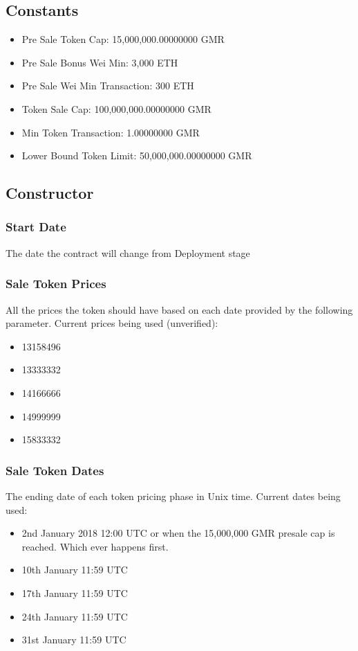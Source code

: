 \documentclass[11pt]{article} %
\begin{document}
\subsection{Constants}

\begin{itemize}
\item Pre Sale Token Cap: 15,000,000.00000000 GMR
\item Pre Sale Bonus Wei Min: 3,000 ETH
\item Pre Sale Wei Min Transaction: 300 ETH
\item Token Sale Cap: 100,000,000.00000000 GMR
\item Min Token Transaction: 1.00000000 GMR
\item Lower Bound Token Limit: 50,000,000.00000000 GMR
\end{itemize}

\subsection{Constructor}

\subsubsection{Start Date}
The date the contract will change from Deployment stage


\subsubsection{Sale Token Prices}
All the prices the token should have based on each date provided by the following parameter.
Current prices being used (unverified): 

\begin{itemize}
\item 13158496
\item 13333332
\item 14166666
\item 14999999
\item 15833332
\end{itemize}


\subsubsection{Sale Token Dates}
The ending date of each token pricing phase in Unix time.
Current dates being used:

\begin{itemize}
\item 2nd January 2018 12:00 UTC or when the 15,000,000 GMR presale cap is reached. Which ever happens first.
\item 10th January 11:59 UTC
\item 17th January 11:59 UTC
\item 24th January 11:59 UTC
\item 31st January 11:59 UTC
\end{itemize}
\end{document}
